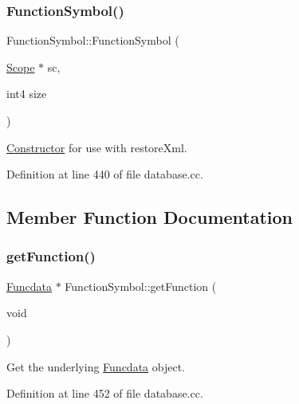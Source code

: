 \subsubsection{\texorpdfstring{FunctionSymbol()}{FunctionSymbol()}\hspace{0.1cm}{\footnotesize\ttfamily [2/2]}}
{\footnotesize\ttfamily Function\+Symbol\+::\+Function\+Symbol (\begin{DoxyParamCaption}\item[{\mbox{\hyperlink{class_scope}{Scope}} $\ast$}]{sc,  }\item[{int4}]{size }\end{DoxyParamCaption})}



\mbox{\hyperlink{class_constructor}{Constructor}} for use with restore\+Xml. 



Definition at line 440 of file database.\+cc.



\subsection{Member Function Documentation}
\mbox{\label{class_function_symbol_ab54ed780e0dd1abdc9447c2e772114fb}} 
\subsubsection{\texorpdfstring{getFunction()}{getFunction()}}
{\footnotesize\ttfamily \mbox{\hyperlink{class_funcdata}{Funcdata}} $\ast$ Function\+Symbol\+::get\+Function (\begin{DoxyParamCaption}\item[{void}]{ }\end{DoxyParamCaption})}



Get the underlying \mbox{\hyperlink{class_funcdata}{Funcdata}} object. 



Definition at line 452 of file database.\+cc.

